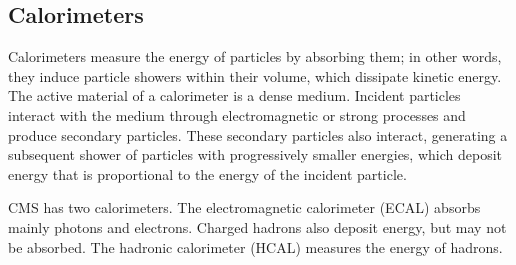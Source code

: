 \subsection{Calorimeters}
Calorimeters measure the energy of particles by absorbing them; in other words,
they induce particle showers within their volume, which dissipate kinetic
energy. The active material of a calorimeter is a dense medium. Incident
particles interact with the medium through electromagnetic or strong processes
and produce secondary particles. These secondary particles also interact,
generating a subsequent shower of particles with progressively smaller energies,
which deposit energy that is proportional to the energy of the incident
particle.

CMS has two calorimeters. The electromagnetic calorimeter (ECAL)  absorbs mainly
photons and electrons. Charged hadrons also deposit energy, but may not be
absorbed. The hadronic calorimeter (HCAL) measures the energy of hadrons.

